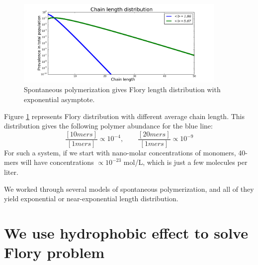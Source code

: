 \documentclass[12pt]{paper}
\newcommand{\pq}[1]{\left[ #1 \right]}
\begin{document}
\begin{figure}[h!]
  \centering
  \includegraphics[width=0.9\textwidth]{pictures/flory2.pdf} 
  \caption{Spontaneous polymerization gives Flory length distribution with exponential asymptote.}
  \label{fig:flory}
\end{figure}
Figure \ref{fig:flory} represents Flory distribution with different average chain length. 
This distribution gives the following 
polymer abundance for the blue line:
\begin{equation}
  \frac{\pq{10mers}}{\pq{1mers}}\propto10^{-4},\qquad\frac{\pq{20mers}}{\pq{1mers}}\propto10^{-9}
\end{equation} 
For such a system, if we start with nano-molar concentrations of monomers, 40-mers will have 
concentrations $\propto 10^{-23} $ mol/L, which is just a few molecules per liter. 

We worked through several models of spontaneous polymerization, and all of they yield exponential 
or near-exponential length distribution.

\section{We use hydrophobic effect to solve Flory problem}
\end{document}
